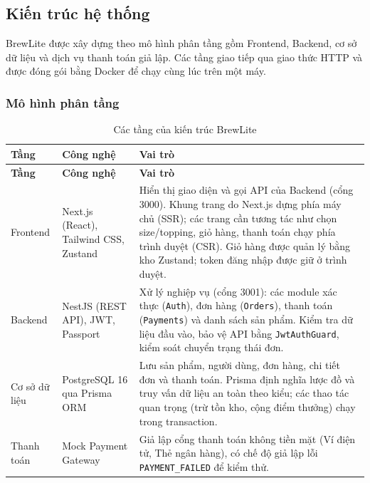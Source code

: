 \subsection{Kiến trúc hệ thống}
\label{sec:kien-truc}

BrewLite được xây dựng theo mô hình phân tầng gồm Frontend, Backend, cơ sở dữ liệu và dịch vụ thanh toán giả lập. Các tầng giao tiếp qua giao thức HTTP và được đóng gói bằng Docker để chạy cùng lúc trên một máy.

\subsubsection{Mô hình phân tầng}

\begin{longtable}{|p{2.4cm}|p{3.6cm}|p{7.5cm}|}
  \caption{Các tầng của kiến trúc BrewLite}\label{tab:kien-truc-tang}\\
  \hline
  \textbf{Tầng} & \textbf{Công nghệ} & \textbf{Vai trò} \\
  \hline
  \endfirsthead
  \hline
  \textbf{Tầng} & \textbf{Công nghệ} & \textbf{Vai trò} \\
  \hline
  \endhead
  Frontend & Next.js (React), Tailwind CSS, Zustand & Hiển thị giao diện và gọi API của Backend (cổng 3000). Khung trang do Next.js dựng phía máy chủ (SSR); các trang cần tương tác như chọn size/topping, giỏ hàng, thanh toán chạy phía trình duyệt (CSR). Giỏ hàng được quản lý bằng kho Zustand; token đăng nhập được giữ ở trình duyệt. \\
  \hline
  Backend & NestJS (REST API), JWT, Passport & Xử lý nghiệp vụ (cổng 3001): các module xác thực (\texttt{Auth}), đơn hàng (\texttt{Orders}), thanh toán (\texttt{Payments}) và danh sách sản phẩm. Kiểm tra dữ liệu đầu vào, bảo vệ API bằng \texttt{JwtAuthGuard}, kiểm soát chuyển trạng thái đơn. \\
  \hline
  Cơ sở dữ liệu & PostgreSQL 16 qua Prisma ORM & Lưu sản phẩm, người dùng, đơn hàng, chi tiết đơn và thanh toán. Prisma định nghĩa lược đồ và truy vấn dữ liệu an toàn theo kiểu; các thao tác quan trọng (trừ tồn kho, cộng điểm thưởng) chạy trong transaction. \\
  \hline
  Thanh toán & Mock Payment Gateway & Giả lập cổng thanh toán không tiền mặt (Ví điện tử, Thẻ ngân hàng), có chế độ giả lập lỗi \texttt{PAYMENT\_FAILED} để kiểm thử. \\
  \hline
\end{longtable}

